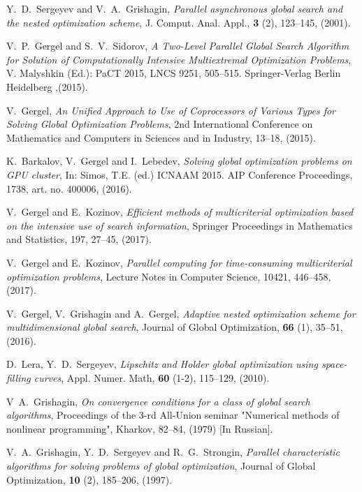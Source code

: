 \documentclass[12pt]{amsart}
\begin{document}
\begin{thebibliography}{20}
Y.~D.~Sergeyev and V.~A.~Grishagin, \textit{Parallel asynchronous global search and the nested optimization scheme}, J. Comput. Anal. Appl., \textbf{3} (2), 123--145, (2001).

V.~P.~Gergel and S.~V.~Sidorov, \textit{A Two-Level Parallel Global Search Algorithm for Solution of Computationally Intensive Multiextremal Optimization Problems}, V. Malyshkin (Ed.): PaCT 2015, LNCS 9251, 505--515. Springer-Verlag Berlin Heidelberg ,(2015).

V.~Gergel, \textit{An Unified Approach to Use of Coprocessors of Various Types for Solving Global Optimization Problems}, 2nd International Conference on Mathematics and Computers in Sciences and in Industry, 13--18, (2015).

K.~Barkalov, V.~Gergel and I.~Lebedev, \textit{Solving global optimization problems on GPU cluster}, In: Simos, T.E. (ed.) ICNAAM 2015. AIP Conference Proceedings, 1738, art. no. 400006, (2016).

V.~Gergel and E.~Kozinov, \textit{Efficient methods of multicriterial optimization based on the intensive use of search information}, Springer Proceedings in Mathematics and Statistics, 197, 27--45, (2017). 

V.~Gergel and E.~Kozinov, \textit{Parallel computing for time-consuming multicriterial optimization problems}, Lecture Notes in Computer Science, 10421, 446--458, (2017).

V.~Gergel, V.~Grishagin and A.~Gergel, \textit{Adaptive nested optimization scheme for multidimensional global search}, Journal of Global Optimization, \textbf{66} (1), 35--51, (2016).

D.~Lera, Y.~D.~Sergeyev, \textit{Lipschitz and Holder global optimization using space-filling curves}, Appl. Numer. Math, \textbf{60} (1-2), 115--129, (2010).

V~A.~Grishagin, \textit{On convergence conditions for a class of global search algorithms}, Proceedings of the 3-rd All-Union seminar "Numerical methods of nonlinear programming", Kharkov, 82--84, (1979) [In Russian].

V.~A.~Grishagin, Y.~D.~Sergeyev and R.~G.~Strongin, \textit{Parallel characteristic algorithms for solving problems of global optimization}, Journal of Global Optimization, \textbf{10} (2), 185--206, (1997).


\end{thebibliography}
\end{document}
